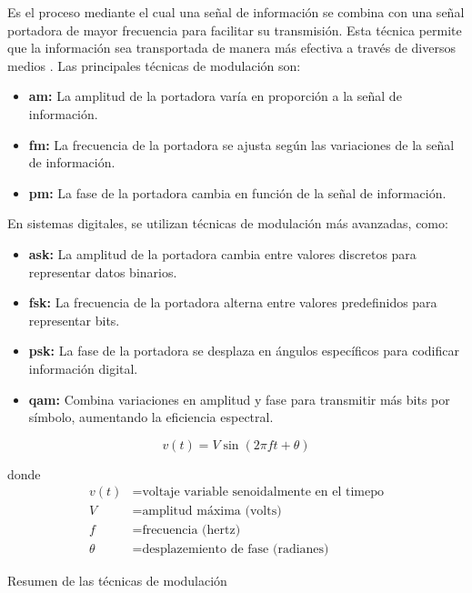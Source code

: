 \begin{justify}
    Es el proceso mediante el cual una señal de información se combina con una señal portadora de mayor frecuencia para facilitar su transmisión. Esta
    técnica permite que la información sea transportada de manera más efectiva a través de diversos medios \parencite{tomasi2003sistemas}. Las principales técnicas de modulación son:

    \begin{itemize}
        \item \textbf{\acrlong{am}:} La amplitud de la portadora varía en proporción a la señal de información.
        
        \item \textbf{\acrlong{fm}:} La frecuencia de la portadora se ajusta según las variaciones de la señal de información.
        
        \item \textbf{\acrlong{pm}:} La fase de la portadora cambia en función de la señal de información.
    \end{itemize}

    En sistemas digitales, se utilizan técnicas de modulación más avanzadas, como:

    \begin{itemize}
        \item \textbf{\acrlong{ask}:} La amplitud de la portadora cambia entre valores discretos para representar datos binarios.
        
        \item \textbf{\acrlong{fsk}:} La frecuencia de la portadora alterna entre valores predefinidos para representar bits.
        
        \item \textbf{\acrlong{psk}:} La fase de la portadora se desplaza en ángulos específicos para codificar información digital.
        
        \item \textbf{\acrlong{qam}:} Combina variaciones en amplitud y fase para transmitir más bits por símbolo, aumentando la eficiencia espectral.
    \end{itemize}

    \begin{equation}
        v(t) = V \sin(2\pi f t + \theta)
        \label{sin_mod}
    \end{equation}

    donde
    \begin{equation*}
        \begin{array}{rl}
            v(t) & = \text{voltaje variable senoidalmente en el timepo}\\
            V & = \text{amplitud máxima (volts)}\\
            f & = \text{frecuencia (hertz)}\\
            \theta & = \text{desplazemiento de fase (radianes)}
        \end{array}
    \end{equation*}

    Resumen de las técnicas de modulación
\end{justify}

